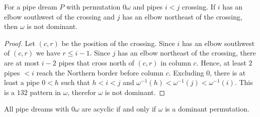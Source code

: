 \begin{lemma}\label{lem:not_dominant}
For a pipe dream $P$ with permutation $0\omega$ and pipes $i<j$ crossing. If $i$ has an elbow southwest of the crossing and $j$ has an elbow northeast of the crossing, then $\omega$ is not dominant.
\end{lemma}

\begin{proof} Let $(c,r)$ be the position of the crossing. Since $i$ has an elbow southwest of $(c,r)$ we have $r\le i-1$.
Since $j$ has an elbow northeast of the crossing, there are at most $i-2$ pipes that cross north of $(c,r)$ in column $c$. 
Hence, at least $2$ pipes $<i$ reach the Northern border before column $c$.
Excluding $0$, there is at least a pipe $0<h$ such that $h<i<j$ and $\omega^{-1}(h)< \omega^{-1}(j)<\omega^{-1}(i)$.
This is a $132$ pattern in $\omega$, therefor $\omega$ is not dominant. \end{proof}


\begin{theorem}
\label{prob:nuAcyclicProperty}
All pipe dreams with $0 \omega$ are acyclic if and only if $\omega$ is a dominant permutation.
\end{theorem}

